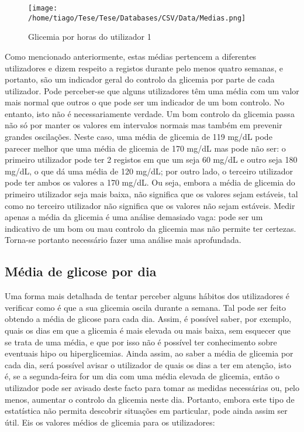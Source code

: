 \begin{figure}[H]
\centering
\texttt{[image: /home/tiago/Tese/Tese/Databases/CSV/Data/Medias.png]}
\caption{Glicemia por horas do utilizador 1}
\end{figure}
Como mencionado anteriormente, estas médias pertencem a diferentes utilizadores e dizem respeito a registos durante pelo menos quatro semanas, e portanto, são um indicador geral do controlo da glicemia por parte de cada utilizador. Pode perceber-se que alguns utilizadores têm uma média com um valor mais normal que outros o que pode ser um indicador de um bom controlo. No entanto, isto não é necessariamente verdade. Um bom controlo da glicemia passa não só por manter os valores em intervalos normais mas também em prevenir grandes oscilações. Neste caso, uma média de glicemia de 119 mg/dL pode parecer melhor que uma média de glicemia de 170 mg/dL mas pode não ser: o primeiro utilizador pode ter 2 registos em que um seja 60 mg/dL e outro seja 180 mg/dL, o que dá uma média de 120 mg/dL; por outro lado, o terceiro utilizador pode ter ambos os valores a 170 mg/dL. Ou seja, embora a média de glicemia do primeiro utilizador seja mais baixa, não significa que os valores sejam estáveis, tal como no terceiro utilizador não significa que os valores não sejam estáveis. Medir apenas a média da glicemia é uma análise demasiado vaga: pode ser um indicativo de um bom ou mau controlo da glicemia mas não permite ter certezas. Torna-se portanto necessário fazer uma análise mais aprofundada.



\subsection{Média de glicose por dia}

Uma forma mais detalhada de tentar perceber alguns hábitos dos utilizadores é verificar como é que a sua glicemia oscila durante a semana. Tal pode ser feito obtendo a média de glicose para cada dia. Assim, é possível saber, por exemplo, quais os dias em que a glicemia é mais elevada ou mais baixa, sem esquecer que se trata de uma média, e que por isso não é possível ter conhecimento sobre eventuais hipo ou hiperglicemias. Ainda assim, ao saber a média de glicemia por cada dia, será possível avisar o utilizador de quais os dias a ter em atenção, isto é, se a segunda-feira for um dia com uma média elevada de glicemia, então o utilizador pode ser avisado deste facto para tomar as medidas necessárias ou, pelo menos, aumentar o controlo da glicemia neste dia. Portanto, embora este tipo de estatística não permita descobrir situações em particular, pode ainda assim ser útil. Eis os valores médios de glicemia para os utilizadores:\newline

